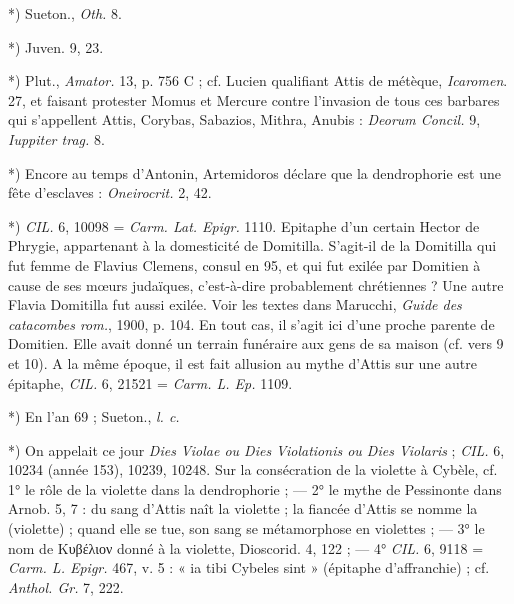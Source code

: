 \documentclass[a4paper, 11pt, oneside, polutonikogreek, french]{article}
\begin{document}
*) Sueton., \emph{Oth.} 8.

*) Juven. 9, 23.

*) Plut., \emph{Amator.} 13, p. 756 C ; cf. Lucien qualifiant Attis de métèque, \emph{Icaromen}. 27, et faisant protester Momus et Mercure contre l'invasion de tous ces barbares qui s'appellent Attis, Corybas, Sabazios, Mithra, Anubis : \emph{Deorum Concil.} 9, \emph{Iuppiter trag.} 8.

*) Encore au temps d'Antonin, Artemidoros déclare que la dendrophorie est une fête d'esclaves : \emph{Oneirocrit.} 2, 42.

*) \emph{CIL.} 6, 10098 = \emph{Carm. Lat. Epigr.} 1110. Epitaphe d'un certain Hector de Phrygie, appartenant à la domesticité de Domitilla. S'agit-il de la Domitilla qui fut femme de Flavius Clemens, consul en 95, et qui fut exilée par Domitien à cause de ses mœurs judaïques, c'est-à-dire probablement chrétiennes ? Une autre Flavia Domitilla fut aussi exilée. Voir les textes dans Marucchi, \emph{Guide des catacombes rom.}, 1900, p. 104. En tout cas, il s'agit ici d'une proche parente de Domitien. Elle avait donné un terrain funéraire aux gens de sa maison (cf. vers 9 et 10). A la même époque, il est fait allusion au mythe d'Attis sur une autre épitaphe, \emph{CIL.} 6, 21521 = \emph{Carm. L. Ep.} 1109.

*) En l'an 69 ; Sueton., \emph{l. c.}

*) On appelait ce jour \emph{Dies Violae ou Dies Violationis ou Dies Violaris} ; \emph{CIL.} 6, 10234 (année 153), 10239, 10248. Sur la consécration de la violette à Cybèle, cf. 1° le rôle de la violette dans la dendrophorie ; --- 2° le mythe de Pessinonte dans Arnob. 5, 7 : du sang d'Attis naît la violette ; la fiancée d'Attis se nomme la (violette) ; quand elle se tue, son sang se métamorphose en violettes ; --- 3° le nom de Kυβέλιον donné à la violette, Dioscorid. 4, 122 ; --- 4° \emph{CIL.} 6, 9118 = \emph{Carm. L. Epigr.} 467, v. 5 : « ia tibi Cybeles sint » (épitaphe d'affranchie) ; cf. \emph{Anthol. Gr.} 7, 222.
\end{document}
